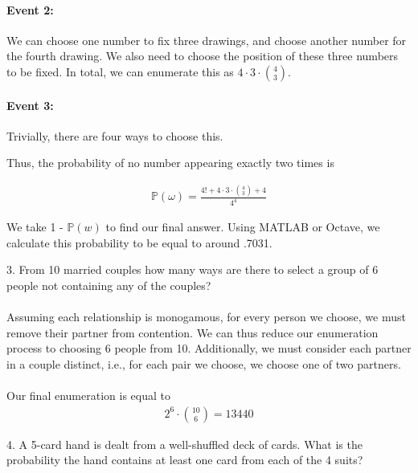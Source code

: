 \documentclass{article}
\begin{document}
\paragraph{Event 2:} We can choose one number to fix three drawings, and choose another number for the fourth drawing.
We also need to choose the position of these three numbers to be fixed. 
In total, we can enumerate this as $4\cdot3 \cdot \binom{4}{3}$.
\paragraph{Event 3:} Trivially, there are four ways to choose this.

\vspace{5mm}

Thus, the probability of no number appearing exactly two times is

\begin{align*}
    \mathbb{P}(\omega) = \frac{4! + 4\cdot3\cdot\binom{4}{3} + 4}{4^{4}}
\end{align*}


We take 1 - $\mathbb{P}(w)$ to find our final answer. Using MATLAB or Octave, 
we calculate this probability to be equal to around .7031.

\vspace{5mm}

3. From 10 married couples how many ways are there to select a group of 6 people not
containing any of the couples?

\paragraph{}Assuming each relationship is monogamous, for every person we choose, we must remove their partner from contention. We can thus reduce our
enumeration process to choosing 6 people from 10. Additionally, we must consider each partner in a couple
distinct, i.e., for each pair we choose, we choose one of two partners. 

\paragraph{}Our final enumeration is equal to
\begin{align*}
    2^{6}\cdot\binom{10}{6} = 13440
\end{align*}

\vspace{5mm}

4. A 5-card hand is dealt from a well-shuffled deck of cards. What is the probability the
hand contains at least one card from each of the 4 suits? 
\end{document}

